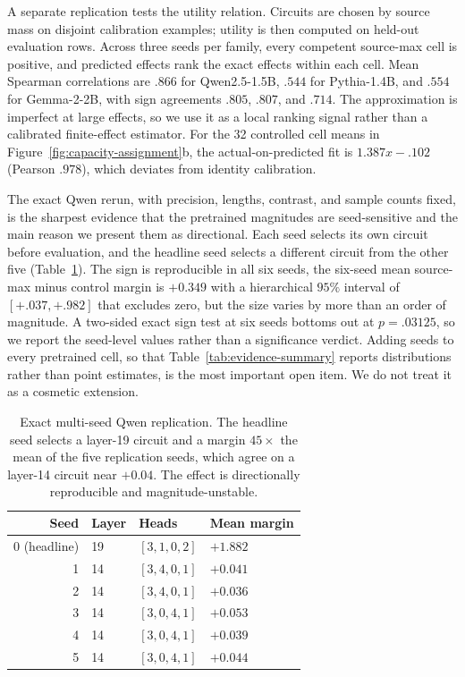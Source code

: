 \documentclass{article}
\begin{document}
A separate replication tests the utility relation. Circuits are chosen by source mass on
disjoint calibration examples; utility is then computed on held-out evaluation rows. Across three seeds per
family, every competent source-max cell is positive, and predicted effects rank the exact effects within each
cell. Mean Spearman correlations are $.866$ for Qwen2.5-1.5B, $.544$ for Pythia-1.4B, and $.554$ for
Gemma-2-2B, with sign agreements $.805$, $.807$, and $.714$. The approximation is imperfect at large effects,
so we use it as a local ranking signal rather than a calibrated finite-effect estimator. For the 32 controlled
cell means in Figure~\ref{fig:capacity-assignment}b, the actual-on-predicted fit is $1.387x-.102$
(Pearson $.978$), which deviates from identity calibration.

The exact Qwen rerun, with precision, lengths, contrast, and sample counts fixed, is the sharpest evidence that
the pretrained magnitudes are seed-sensitive and the main reason we present them as directional. Each seed
selects its own circuit before evaluation, and the headline seed selects a different circuit from the other
five (Table~\ref{tab:qwen-seeds}). The sign is reproducible in all six seeds, the six-seed mean source-max
minus control margin is $+0.349$ with a hierarchical $95\%$ interval of $[+.037,+.982]$ that excludes zero, but
the size varies by more than an order of magnitude. A two-sided exact sign test at six seeds bottoms out at
$p=.03125$, so we report the seed-level values rather than a significance verdict. Adding seeds to every
pretrained cell, so that Table~\ref{tab:evidence-summary} reports distributions rather than point estimates, is
the most important open item. We do not treat it as a cosmetic extension.

\begin{table}[!ht]
\centering
\small
\begin{tabular*}{\columnwidth}{@{\extracolsep{\fill}}rlll}
\toprule
Seed & Layer & Heads & Mean margin \\
\midrule
0 (headline) & 19 & $[3,1,0,2]$ & $+1.882$ \\
1 & 14 & $[3,4,0,1]$ & $+0.041$ \\
2 & 14 & $[3,4,0,1]$ & $+0.036$ \\
3 & 14 & $[3,0,4,1]$ & $+0.053$ \\
4 & 14 & $[3,0,4,1]$ & $+0.039$ \\
5 & 14 & $[3,0,4,1]$ & $+0.044$ \\
\bottomrule
\end{tabular*}
\caption{Exact multi-seed Qwen replication. The headline seed selects a layer-19 circuit and a margin $45\times$
the mean of the five replication seeds, which agree on a layer-14 circuit near $+0.04$. The effect is
directionally reproducible and magnitude-unstable.}
\label{tab:qwen-seeds}
\end{table}
\end{document}
